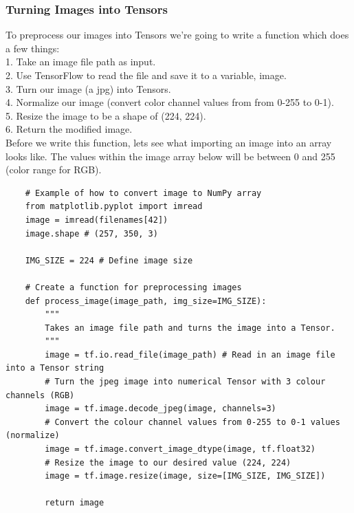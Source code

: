 \documentclass[11pt, a4paper]{article}
\begin{document}
\begin{spacing}{1.1}
	\subsubsection{Turning Images into Tensors}
	To preprocess our images into Tensors we're going to write a function which does a few things: \vspace*{1mm} \\
	\hspace*{2mm} 1. Take an image file path as input. \\
	\hspace*{2mm} 2. Use TensorFlow to read the file and save it to a variable, image. \\
	\hspace*{2mm} 3. Turn our image (a jpg) into Tensors. \\
	\hspace*{2mm} 4. Normalize our image (convert color channel values from from 0-255 to 0-1). \\
	\hspace*{2mm} 5. Resize the image to be a shape of (224, 224). \\
	\hspace*{2mm} 6. Return the modified image. \vspace*{1mm} \\
	Before we write this function, lets see what importing an image into an array looks like. The values within the image array below will be between 0 and 255 (color range for RGB). 
	\begin{lstlisting}
	# Example of how to convert image to NumPy array
	from matplotlib.pyplot import imread
	image = imread(filenames[42])
	image.shape # (257, 350, 3)
	
	IMG_SIZE = 224 # Define image size
	
	# Create a function for preprocessing images
	def process_image(image_path, img_size=IMG_SIZE):
		"""
		Takes an image file path and turns the image into a Tensor.
		"""
		image = tf.io.read_file(image_path) # Read in an image file into a Tensor string
		# Turn the jpeg image into numerical Tensor with 3 colour channels (RGB)
		image = tf.image.decode_jpeg(image, channels=3)
		# Convert the colour channel values from 0-255 to 0-1 values (normalize)
		image = tf.image.convert_image_dtype(image, tf.float32)
		# Resize the image to our desired value (224, 224)
		image = tf.image.resize(image, size=[IMG_SIZE, IMG_SIZE])
		
		return image \end{lstlisting} \vspace*{1mm}

\end{spacing}
\end{document}
